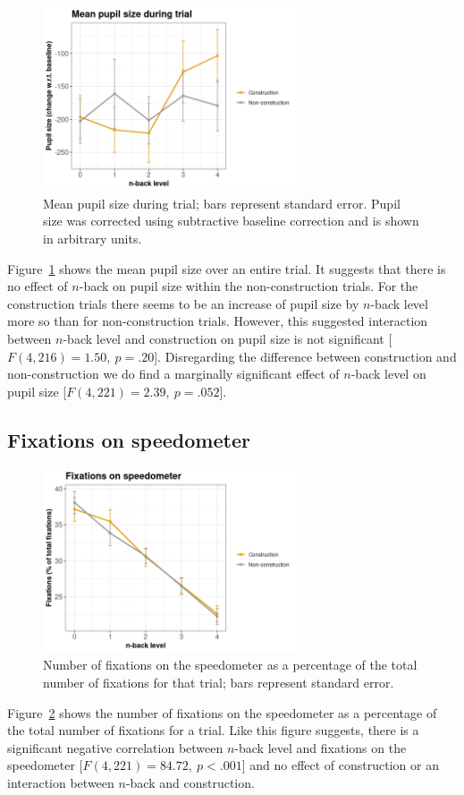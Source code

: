 \begin{figure}[tp]
  \centering
  \includegraphics[width=7.5cm]{images/pupil_size_interaction.png}
  \caption{Mean pupil size during trial; bars represent standard error.
  Pupil size was corrected using subtractive baseline correction and is shown in arbitrary units.}
  \label{fig:mean-ps}
\end{figure}

Figure~\ref{fig:mean-ps} shows the mean pupil size over an entire trial. 
It suggests that there is no effect of \(n\)-back on pupil size within the non-construction trials.
For the construction trials there seems to be an increase of pupil size by \(n\)-back level more so than for non-construction trials.
However, this suggested interaction between \(n\)-back level and construction on pupil size is not significant [\(F(4,216)=1.50,\ p=.20\)].
Disregarding the difference between construction and non-construction we do find a marginally significant effect of \(n\)-back level on pupil size [\(F(4,221)=2.39,\ p=.052\)].

\subsection{Fixations on speedometer}

\begin{figure}[tp]
  \centering
  \includegraphics[width=7.5cm]{images/speedometer_interaction.png}
  \caption{Number of fixations on the speedometer as a percentage of the total number of fixations for that trial; bars represent standard error.}
  \label{fig:fix-speedometer}
\end{figure}

Figure~\ref{fig:fix-speedometer} shows the number of fixations on the speedometer as a percentage of the total number of fixations for a trial.
Like this figure suggests, there is a significant negative correlation between \(n\)-back level and fixations on the speedometer [\(F(4,221)=84.72,\ p<.001\)] and no effect of construction or an interaction between \(n\)-back and construction. 